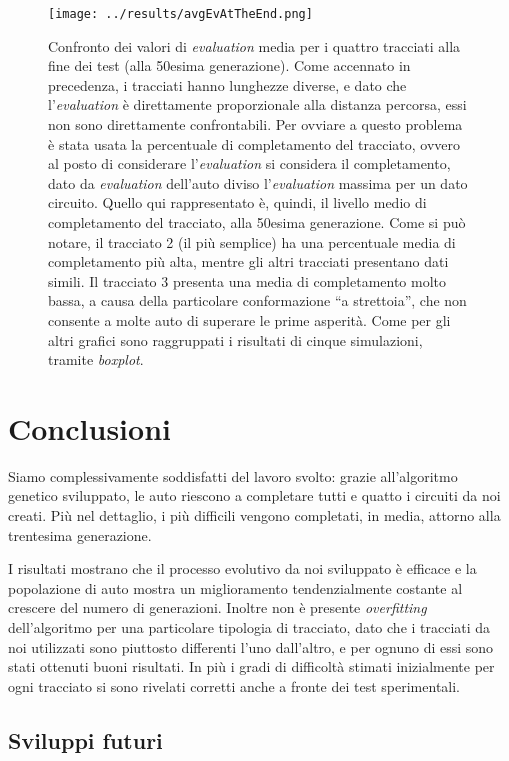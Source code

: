 \documentclass[a4paper,12pt]{article}
\begin{document}
\begin{figure}[H]
	\centering
	\texttt{[image: ../results/avgEvAtTheEnd.png]}
	\caption{Confronto dei valori di \emph{evaluation} media per i quattro tracciati alla fine dei test (alla 50esima generazione). Come accennato in precedenza, i tracciati hanno lunghezze diverse, e dato che l'\emph{evaluation} è direttamente proporzionale alla distanza percorsa, essi non sono direttamente confrontabili. Per ovviare a questo problema è stata usata la percentuale di completamento del tracciato, ovvero al posto di considerare l'\emph{evaluation} si considera il completamento, dato da \emph{evaluation} dell'auto diviso l'\emph{evaluation} massima per un dato circuito. Quello qui rappresentato è, quindi, il livello medio di completamento del tracciato, alla 50esima generazione. Come si può notare, il tracciato 2 (il più semplice) ha una percentuale media di completamento più alta, mentre gli altri tracciati presentano dati simili. Il tracciato 3 presenta una media di completamento molto bassa, a causa della particolare conformazione ``a strettoia'', che non consente a molte auto di superare le prime asperità. Come per gli altri grafici sono raggruppati i risultati di cinque simulazioni, tramite \emph{boxplot}.}
\end{figure}


\section{Conclusioni} \label{conclusions}

Siamo complessivamente soddisfatti del lavoro svolto: grazie all'algoritmo genetico sviluppato, le auto riescono a completare tutti e quatto i circuiti da noi creati. Più nel dettaglio, i più difficili vengono completati, in media, attorno alla trentesima generazione.

I risultati mostrano che il processo evolutivo da noi sviluppato è efficace e la popolazione di auto mostra un miglioramento tendenzialmente costante al crescere del numero di generazioni. Inoltre non è presente \emph{overfitting} dell'algoritmo per una particolare tipologia di tracciato, dato che i tracciati da noi utilizzati sono piuttosto differenti l'uno dall'altro, e per ognuno di essi sono stati ottenuti buoni risultati. In più i gradi di difficoltà stimati inizialmente per ogni tracciato si sono rivelati corretti anche a fronte dei test sperimentali. 

\subsection*{Sviluppi futuri}
\end{document}
